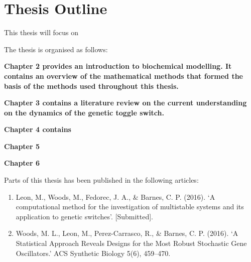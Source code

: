 \section{Thesis Outline}

This thesis will focus on

The thesis is organised as follows:

\bfseries{Chapter 2} provides an introduction to biochemical modelling. It contains an overview of the mathematical methods that formed the basis of the methods used throughout this thesis.  

\bfseries{Chapter 3} contains a literature review on the current understanding on the dynamics of the genetic toggle switch. 


\bfseries{Chapter 4} contains 


\bfseries{Chapter 5}


\bfseries{Chapter 6}



Parts of this thesis has been published in the following articles:

\begin{enumerate}
	\item Leon, M., Woods, M., Fedorec, J. A., \& Barnes, C. P. (2016). ‘A computational method for the investigation of multistable systems and its application to genetic switches’. [Submitted].
	\item Woods, M. L., Leon, M., Perez-Carrasco, R., \& Barnes, C. P. (2016). ‘A Statistical Approach Reveals Designs for the Most Robust Stochastic Gene Oscillators.’ ACS Synthetic Biology 5(6), 459–470.
	
\end{enumerate}